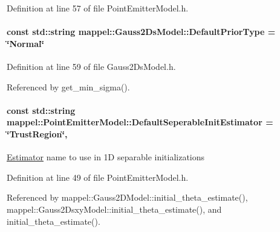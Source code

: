 Definition at line 57 of file Point\+Emitter\+Model.\+h.

\paragraph[{\texorpdfstring{Default\+Prior\+Type}{DefaultPriorType}}]{\setlength{\rightskip}{0pt plus 5cm}const std\+::string mappel\+::\+Gauss2\+Ds\+Model\+::\+Default\+Prior\+Type = \char`\"{}Normal\char`\"{}\hspace{0.3cm}{\ttfamily [static]}}\hypertarget{classmappel_1_1Gauss2DsModel_ac00cce582449c74c64f624ec85c9e164}{}\label{classmappel_1_1Gauss2DsModel_ac00cce582449c74c64f624ec85c9e164}


Definition at line 59 of file Gauss2\+Ds\+Model.\+h.



Referenced by get\+\_\+min\+\_\+sigma().

\paragraph[{\texorpdfstring{Default\+Seperable\+Init\+Estimator}{DefaultSeperableInitEstimator}}]{\setlength{\rightskip}{0pt plus 5cm}const std\+::string mappel\+::\+Point\+Emitter\+Model\+::\+Default\+Seperable\+Init\+Estimator = \char`\"{}Trust\+Region\char`\"{}\hspace{0.3cm}{\ttfamily [static]}, {\ttfamily [inherited]}}\hypertarget{classmappel_1_1PointEmitterModel_ad8c3dc629d75d22f25855a5f1ba8729f}{}\label{classmappel_1_1PointEmitterModel_ad8c3dc629d75d22f25855a5f1ba8729f}
\hyperlink{classmappel_1_1Estimator}{Estimator} name to use in 1D separable initializations 

Definition at line 49 of file Point\+Emitter\+Model.\+h.



Referenced by mappel\+::\+Gauss2\+D\+Model\+::initial\+\_\+theta\+\_\+estimate(), mappel\+::\+Gauss2\+Dsxy\+Model\+::initial\+\_\+theta\+\_\+estimate(), and initial\+\_\+theta\+\_\+estimate().


